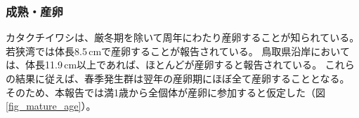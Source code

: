 \subsubsection{成熟・産卵}
カタクチイワシは、厳冬期を除いて周年にわたり産卵することが知られている。
若狭湾では体長8.5\,cmで産卵することが報告されている\citep{Funamoto2004}。
鳥取県沿岸においては、体長11.9\,cm以上であれば、ほとんどが産卵すると報告されている\citep{Shimura2008}。
これらの結果に従えば、春季発生群は翌年の産卵期にほぼ全て産卵することとなる。
そのため、本報告では満1歳から全個体が産卵に参加すると仮定した（図\,\ref{fig_mature_age}）。
